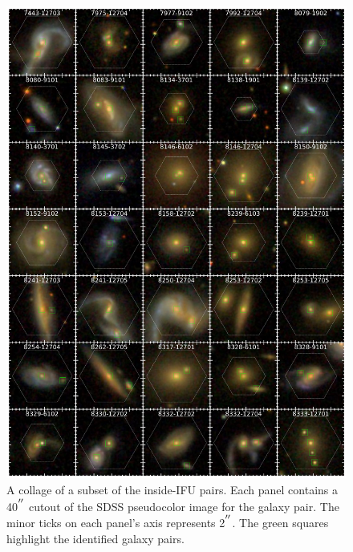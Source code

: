 \documentclass[iop,revtex4,twocolumn,apj,numberedappendix,appendixfloats]{emulateapj}
\begin{document}
\begin{figure}
\centering
\includegraphics[width=\linewidth]{fig/pair_collage.pdf}
\caption[A collage of a subset of the inside-IFU pairs.]{A collage of a subset of the inside-IFU pairs. Each panel contains a 40$^{\mbox{$^{\prime\prime}$}}$ cutout of the SDSS pseudocolor image for the galaxy pair. The minor ticks on each panel's axis represents 2$^{\mbox{$^{\prime\prime}$}}$. The green squares highlight the identified galaxy pairs. }
\label{fig:collage}
\end{figure}
\end{document}
